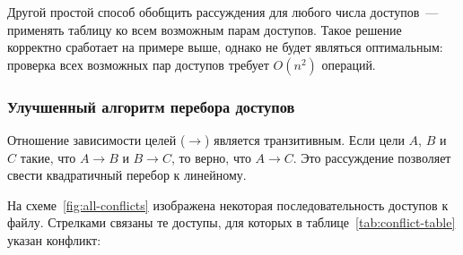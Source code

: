 Другой простой способ обобщить рассуждения для любого числа доступов~--- применять таблицу ко всем возможным парам доступов. Такое решение корректно сработает на примере выше, однако не будет являться оптимальным: проверка всех возможных пар доступов требует $O(n^2)$ операций.

\subsubsection{Улучшенный алгоритм перебора доступов}
\label{subsubsec:linear-time-proof}

Отношение зависимости целей ($\rightarrow$) является транзитивным. Если цели $A$, $B$ и $C$ такие, что $A \rightarrow B$ и $B \rightarrow C$, то верно, что $A \rightarrow C$. Это рассуждение позволяет свести квадратичный перебор к линейному.

На схеме~\ref{fig:all-conflicts} изображена некоторая последовательность доступов к файлу. Стрелками связаны те доступы, для которых в таблице~\ref{tab:conflict-table} указан конфликт:

